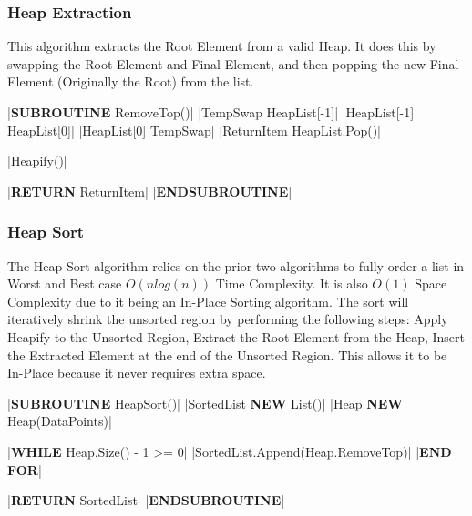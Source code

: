 \begin{flushleft}
                \vspace{0.5cm}
            \subsubsection{Heap Extraction}
                This algorithm extracts the Root Element from a valid Heap. It does this by swapping the Root Element and Final Element, and then
                popping the new Final Element (Originally the Root) from the list. 
                \vspace{0.2cm}

                \begin{pseudocode}
|\textbf{SUBROUTINE} RemoveTop()|
    |TempSwap \leftarrow HeapList[-1]|
    |HeapList[-1] \leftarrow HeapList[0]|
    |HeapList[0] \leftarrow TempSwap|
    |ReturnItem \leftarrow HeapList.Pop()|

    |Heapify()|

    |\textbf{RETURN} ReturnItem|
|\textbf{ENDSUBROUTINE}| 
                \end{pseudocode}

                \vspace{0.5cm}
            \subsubsection{Heap Sort}
                The Heap Sort algorithm relies on the prior two algorithms to fully order a list in Worst and Best case $O(nlog(n))$ Time Complexity. It 
                is also $O(1)$ Space Complexity due to it being an In-Place Sorting algorithm. The sort will iteratively shrink the unsorted region by 
                performing the following steps: Apply Heapify to the Unsorted Region, Extract the Root Element from the Heap, Insert the Extracted Element 
                at the end of the Unsorted Region. This allows it to be In-Place because it never requires extra space.
                \vspace{0.2cm}

                \begin{pseudocode}
|\textbf{SUBROUTINE} HeapSort()|
    |SortedList \leftarrow \textbf{NEW} List()|
    |Heap \leftarrow \textbf{NEW} Heap(DataPoints)|

    |\textbf{WHILE} Heap.Size() - 1 >= 0|
        |SortedList.Append(Heap.RemoveTop)|
    |\textbf{END FOR}|

    |\textbf{RETURN} SortedList|
|\textbf{ENDSUBROUTINE}|
                \end{pseudocode}


\end{flushleft}
